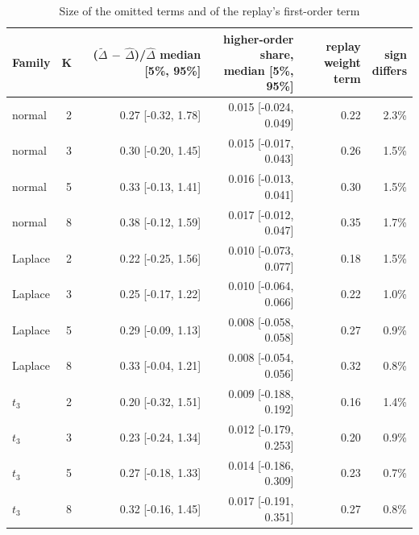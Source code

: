 \begin{table}[htbp]
\centering
\caption{Size of the omitted terms and of the replay's first-order term}
\label{tab:a7_approximation}
\small
\begin{tabular}{lrrrrr}
\toprule
Family & K & \makecell[b]{($\tilde\Delta$ $-$ $\hat\Delta$)/$\hat\Delta$\\{}median [5\%, 95\%]} & \makecell[b]{higher-order share,\\{}median [5\%, 95\%]} & \makecell[b]{replay\\{}weight term} & \makecell[b]{sign\\{}differs} \\
\midrule
normal & 2 & 0.27 [-0.32, 1.78] & 0.015 [-0.024, 0.049] & 0.22 & 2.3\% \\
normal & 3 & 0.30 [-0.20, 1.45] & 0.015 [-0.017, 0.043] & 0.26 & 1.5\% \\
normal & 5 & 0.33 [-0.13, 1.41] & 0.016 [-0.013, 0.041] & 0.30 & 1.5\% \\
normal & 8 & 0.38 [-0.12, 1.59] & 0.017 [-0.012, 0.047] & 0.35 & 1.7\% \\
Laplace & 2 & 0.22 [-0.25, 1.56] & 0.010 [-0.073, 0.077] & 0.18 & 1.5\% \\
Laplace & 3 & 0.25 [-0.17, 1.22] & 0.010 [-0.064, 0.066] & 0.22 & 1.0\% \\
Laplace & 5 & 0.29 [-0.09, 1.13] & 0.008 [-0.058, 0.058] & 0.27 & 0.9\% \\
Laplace & 8 & 0.33 [-0.04, 1.21] & 0.008 [-0.054, 0.056] & 0.32 & 0.8\% \\
$t_3$ & 2 & 0.20 [-0.32, 1.51] & 0.009 [-0.188, 0.192] & 0.16 & 1.4\% \\
$t_3$ & 3 & 0.23 [-0.24, 1.34] & 0.012 [-0.179, 0.253] & 0.20 & 0.9\% \\
$t_3$ & 5 & 0.27 [-0.18, 1.33] & 0.014 [-0.186, 0.309] & 0.23 & 0.7\% \\
$t_3$ & 8 & 0.32 [-0.16, 1.45] & 0.017 [-0.191, 0.351] & 0.27 & 0.8\% \\
\bottomrule
\end{tabular}
\end{table}
